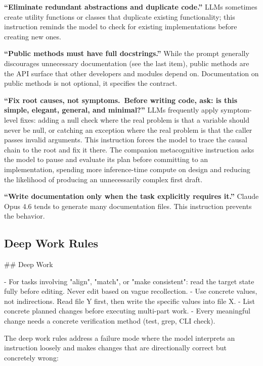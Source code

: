 \documentclass{article}
\begin{document}
\textbf{``Eliminate redundant abstractions and duplicate code.''}  LLMs sometimes create utility functions or classes that duplicate existing functionality; this instruction reminds the model to check for existing implementations before creating new ones.

\textbf{``Public methods must have full docstrings.''}  While the prompt generally discourages unnecessary documentation (see the last item), public methods are the API surface that other developers and modules depend on.  Documentation on public methods is not optional, it specifies the contract.

\textbf{``Fix root causes, not symptoms.\ Before writing code, ask: is this simple, elegant, general, and minimal?''}  LLMs frequently apply symptom-level fixes: adding a null check where the real problem is that a variable should never be null, or catching an exception where the real problem is that the caller passes invalid arguments.  This instruction forces the model to trace the causal chain to the root and fix it there.  The companion metacognitive instruction asks the model to pause and evaluate its plan before committing to an implementation, spending more inference-time compute on design and reducing the likelihood of producing an unnecessarily complex first draft.

\textbf{``Write documentation only when the task explicitly requires it.''}  Claude Opus 4.6 tends to generate many documentation files.  This instruction prevents the behavior.

\subsection{Deep Work Rules}

\begin{prompt}
## Deep Work

- For tasks involving "align", "match", or "make
  consistent": read the target state fully before
  editing. Never edit based on vague recollection.
- Use concrete values, not indirections. Read file Y
  first, then write the specific values into file X.
- List concrete planned changes before executing
  multi-part work.
- Every meaningful change needs a concrete verification
  method (test, grep, CLI check).
\end{prompt}

\noindent The deep work rules address a failure mode where the model interprets an instruction loosely and makes changes that are directionally correct but concretely wrong:
\end{document}
